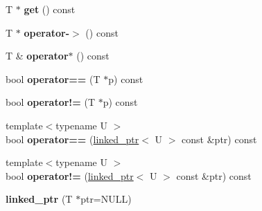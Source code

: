 \begin{DoxyCompactItemize}
\item 
\hypertarget{classtesting_1_1internal_1_1linked__ptr_a6ea8584d9bcad13c3266834f5ce5e771}{}T $\ast$ {\bfseries get} () const \label{classtesting_1_1internal_1_1linked__ptr_a6ea8584d9bcad13c3266834f5ce5e771}

\item 
\hypertarget{classtesting_1_1internal_1_1linked__ptr_aa878c3e874242fb3cd2aa14ec603aa25}{}T $\ast$ {\bfseries operator-\/$>$} () const \label{classtesting_1_1internal_1_1linked__ptr_aa878c3e874242fb3cd2aa14ec603aa25}

\item 
\hypertarget{classtesting_1_1internal_1_1linked__ptr_aec393cbd60f96defde36ef8a69d94254}{}T \& {\bfseries operator$\ast$} () const \label{classtesting_1_1internal_1_1linked__ptr_aec393cbd60f96defde36ef8a69d94254}

\item 
\hypertarget{classtesting_1_1internal_1_1linked__ptr_abe2154fd3ad3574dfe6f2320bc1debc4}{}bool {\bfseries operator==} (T $\ast$p) const \label{classtesting_1_1internal_1_1linked__ptr_abe2154fd3ad3574dfe6f2320bc1debc4}

\item 
\hypertarget{classtesting_1_1internal_1_1linked__ptr_a3685f9661bbe410cfa58fea2f14396b7}{}bool {\bfseries operator!=} (T $\ast$p) const \label{classtesting_1_1internal_1_1linked__ptr_a3685f9661bbe410cfa58fea2f14396b7}

\item 
\hypertarget{classtesting_1_1internal_1_1linked__ptr_a3b46c9ecfd928673a524dcb3c70fd2ad}{}{\footnotesize template$<$typename U $>$ }\\bool {\bfseries operator==} (\hyperlink{classtesting_1_1internal_1_1linked__ptr}{linked\+\_\+ptr}$<$ U $>$ const \&ptr) const \label{classtesting_1_1internal_1_1linked__ptr_a3b46c9ecfd928673a524dcb3c70fd2ad}

\item 
\hypertarget{classtesting_1_1internal_1_1linked__ptr_a6449584b90a09a313300599fb3a23633}{}{\footnotesize template$<$typename U $>$ }\\bool {\bfseries operator!=} (\hyperlink{classtesting_1_1internal_1_1linked__ptr}{linked\+\_\+ptr}$<$ U $>$ const \&ptr) const \label{classtesting_1_1internal_1_1linked__ptr_a6449584b90a09a313300599fb3a23633}

\item 
\hypertarget{classtesting_1_1internal_1_1linked__ptr_ae805418b9f03f14ff49649e710475dba}{}{\bfseries linked\+\_\+ptr} (T $\ast$ptr=N\+U\+L\+L)\label{classtesting_1_1internal_1_1linked__ptr_ae805418b9f03f14ff49649e710475dba}


\end{DoxyCompactItemize}
